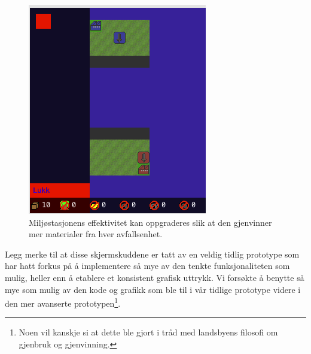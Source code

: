 \begin{figure}
\centering
\includegraphics[scale=0.7]{images/OppgradereEnv.png}
\caption{Miljøstasjonens effektivitet kan oppgraderes slik at den gjenvinner mer materialer fra hver avfallsenhet.}
\label{fig:OppgradereEnv}
\end{figure}



Legg merke til at disse skjermskuddene er tatt av en veldig tidlig prototype som har hatt forkus på å implementere så mye av den tenkte funksjonaliteten som mulig, heller enn å etablere et konsistent grafisk uttrykk. Vi forsøkte å benytte så mye som mulig av den kode og grafikk som ble til i vår tidlige prototype videre i den mer avanserte prototypen\footnote{Noen vil kanskje si at dette ble gjort i tråd med landsbyens filosofi om gjenbruk og gjenvinning.}.
